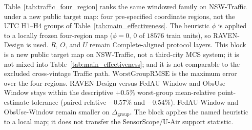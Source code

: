 Table~\ref{tab:traffic_four_region} ranks the same windowed family on
NSW-Traffic under a new public target map: four pre-specified coordinate
regions, not the UTC H1--H4 groups of Table~\ref{tab:main_effectiveness}.
The heuristic $\phi$ is applied to a locally frozen four-region map
($\phi=0$, $0$ of $18576$ train units), so RAVEN-Design is used.
$R$, $O$, and $U$ remain Complete-aligned protocol layers.
This block is a new public target map on NSW-Traffic, not a third-city
MCS system; it is not mixed into Table~\ref{tab:main_effectiveness};
and it is not comparable to the excluded cross-vintage Traffic path.
$\mathrm{WorstGroupRMSE}$ is the maximum error over the four regions.
RAVEN-Design versus FedAU-Window and ObsUse-Window stays within
the descriptive $+0.5\%$ worst-group mean-relative point-estimate
tolerance (paired relative $-0.57\%$ and $-0.54\%$).
FedAU-Window and ObsUse-Window remain smaller on $\Delta_{\mathrm{group}}$.
The block applies the named heuristic to a local map; it does not transfer
the SensorScope/U-Air support statistic.

